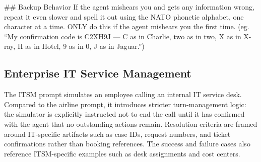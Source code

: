 \begin{tcolorbox}[promptbox, title={\small \texttt{Airline CSM Simulator Prompt}}]
\#\# Backup Behavior\newline
If the agent mishears you and gets any information wrong, repeat it even slower and spell it out using the NATO phonetic alphabet, one character at a time. ONLY do this if the agent mishears you the first time.\newline
(eg. ``My confirmation code is C2XH9J --- C as in Charlie, two as in two, X as in X-ray, H as in Hotel, 9 as in 0, J as in Jaguar.'')
\end{tcolorbox}

\subsection{Enterprise IT Service Management}
\label{appendix:prompt-itsm}

The ITSM prompt simulates an employee calling an internal IT service desk. Compared to the airline prompt, it introduces stricter turn-management logic: the simulator is explicitly instructed not to end the call until it has confirmed with the agent that no outstanding actions remain. Resolution criteria are framed around IT-specific artifacts such as case IDs, request numbers, and ticket confirmations rather than booking references. The success and failure cases also reference ITSM-specific examples such as desk assignments and cost centers.

